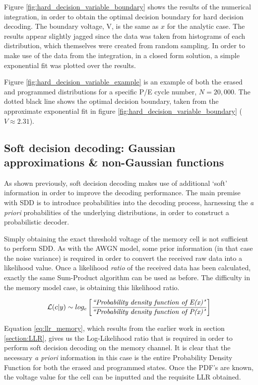 \documentclass[11pt]{article}
\numberwithin{equation}{subsection}
\begin{document}
Figure \ref{fig:hard_decision_variable_boundary} shows the results of the numerical integration, in order to obtain the optimal decision boundary for hard decision decoding. The boundary voltage, V, is the same as $x$ for the analytic case. The results appear slightly jagged since the data was taken from histograms of each distribution, which themselves were created from random sampling. In order to make use of the data from the integration, in a closed form solution, a simple exponential fit was plotted over the results. 

Figure \ref{fig:hard_decision_variable_example} is an example of both the erased and programmed distributions for a specific P/E cycle number, $N=20,000$. The dotted black line shows the optimal decision boundary, taken from the approximate exponential fit in figure \ref{fig:hard_decision_variable_boundary} ($V \approx 2.31$).

\subsection{Soft decision decoding: Gaussian approximations \& non-Gaussian functions}
As shown previously, soft decision decoding makes use of additional `soft' information in order to improve the decoding performance. The main premise with SDD is to introduce probabilities into the decoding process, harnessing the \textit{a priori} probabilities of the underlying distributions, in order to construct a probabilistic decoder.

Simply obtaining the exact threshold voltage of the memory cell is not sufficient to perform SDD. As with the AWGN model, some prior information (in that case the noise variance) is required in order to convert the received raw data into a likelihood value. Once a likelihood \textit{ratio} of the received data has been calculated, exactly the same Sum-Product algorithm can be used as before. The difficulty in the memory model case, is obtaining this likelihood ratio.

\begin{equation} \label{eq:llr_memory}
\mathcal{L}(c|y) \sim log_e \left[ \dfrac{\text{\textit{``Probability density function of E(x)"}}}{\text{\textit{``Probability density function of P(x)"}}} \right]
\end{equation}

Equation \ref{eq:llr_memory}, which results from the earlier work in section \ref{section:LLR}, gives us the Log-Likelihood ratio that is required in order to perform soft decision decoding on the memory channel. It is clear that the necessary \textit{a priori} information in this case is the entire Probability Density Function for both the erased and programmed states. Once the PDF's are known, the voltage value for the cell can be inputted and the requisite LLR obtained.
\end{document}
